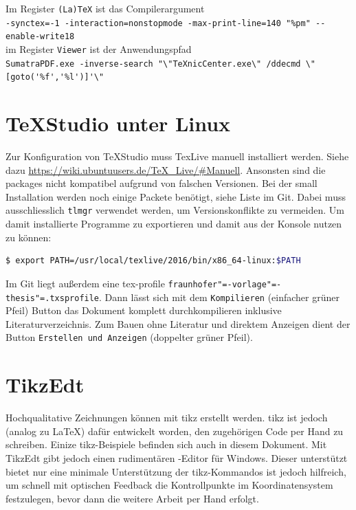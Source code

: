 Im Register \texttt{(La)TeX} ist das Compilerargument\\
{\small\verb#-synctex=-1 -interaction=nonstopmode -max-print-line=140 "%pm" --enable-write18#}\\
im Register \texttt{Viewer} ist der Anwendungspfad\\
{\small\verb#SumatraPDF.exe -inverse-search "\"TeXnicCenter.exe\" /ddecmd \"[goto('%f','%l')]'\"#}\\

\section{TeXStudio unter Linux}
Zur Konfiguration von TeXStudio muss TexLive manuell installiert werden. Siehe dazu \url{https://wiki.ubuntuusers.de/TeX_Live/#Manuell}. Ansonsten sind die packages nicht kompatibel aufgrund von falschen Versionen. 
Bei der small Installation werden noch einige Packete benötigt, siehe Liste im Git. Dabei muss ausschliesslich \texttt{tlmgr} verwendet werden, um Versionskonflikte zu vermeiden. Um damit installierte Programme zu exportieren und damit aus der Konsole nutzen zu können: \begin{lstlisting}[language=bash]
$ export PATH=/usr/local/texlive/2016/bin/x86_64-linux:$PATH
\end{lstlisting}
Im Git liegt außerdem eine tex-profile \texttt{fraunhofer"=-vorlage"=-thesis"=.txsprofile}. Dann lässt sich mit dem \texttt{Kompilieren} (einfacher grüner Pfeil) Button das Dokument komplett durchkompilieren inklusive Literaturverzeichnis. Zum Bauen ohne Literatur und direktem Anzeigen dient der Button \texttt{Erstellen und Anzeigen} (doppelter grüner Pfeil).


\section{TikzEdt}

Hochqualitative Zeichnungen können mit \gls{tikz} erstellt werden. \Gls{tikz} ist jedoch
(analog zu LaTeX) dafür entwickelt worden, den zugehörigen Code per Hand zu
schreiben. Einize \gls{tikz}-Beispiele befinden sich auch in diesem Dokument.
Mit TikzEdt gibt jedoch einen rudimentären -Editor für Windows. Dieser
unterstützt bietet nur eine minimale Unterstützung der \gls{tikz}-Kommandos ist jedoch
hilfreich, um schnell mit optischen Feedback die Kontrollpunkte im
Koordinatensystem festzulegen, bevor dann die weitere Arbeit per Hand erfolgt.


